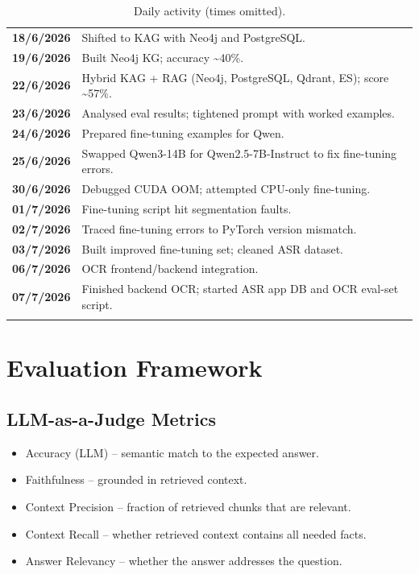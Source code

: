 \documentclass[11pt,a4paper]{article}
\begin{document}
\begin{longtable}{@{}>{\bfseries}p{}p{}@{}}
18/6/2026 & Shifted to KAG with Neo4j and PostgreSQL. \\
19/6/2026 & Built Neo4j KG; accuracy \textasciitilde40\%. \\
22/6/2026 & Hybrid KAG + RAG (Neo4j, PostgreSQL, Qdrant, ES); score \textasciitilde57\%. \\
23/6/2026 & Analysed eval results; tightened prompt with worked examples. \\
24/6/2026 & Prepared fine-tuning examples for Qwen. \\
25/6/2026 & Swapped Qwen3-14B for Qwen2.5-7B-Instruct to fix fine-tuning errors. \\
30/6/2026 & Debugged CUDA OOM; attempted CPU-only fine-tuning. \\
01/7/2026 & Fine-tuning script hit segmentation faults. \\
02/7/2026 & Traced fine-tuning errors to PyTorch version mismatch. \\
03/7/2026 & Built improved fine-tuning set; cleaned ASR dataset. \\
06/7/2026 & OCR frontend/backend integration. \\
07/7/2026 & Finished backend OCR; started ASR app DB and OCR eval-set script. \\
\bottomrule
\caption{Daily activity (times omitted).}
\end{longtable}

\section{Evaluation Framework}

\subsection{LLM-as-a-Judge Metrics}
\begin{itemize}[leftmargin=1.2cm]
    \item Accuracy (LLM) -- semantic match to the expected answer.
    \item Faithfulness -- grounded in retrieved context.
    \item Context Precision -- fraction of retrieved chunks that are relevant.
    \item Context Recall -- whether retrieved context contains all needed facts.
    \item Answer Relevancy -- whether the answer addresses the question.
\end{itemize}
\end{document}

